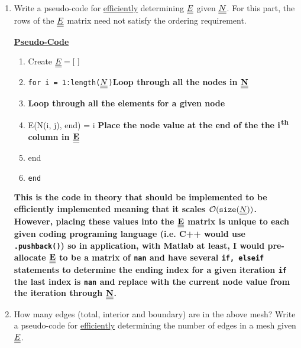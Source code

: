\begin{enumerate}[label=\alph*., start = 1]
    \begin{fminipage}{0.8\linewidth}
        \textbf{Shown above are the matrices for $\bf \doubleunderline{E}$ and $\bf \doubleunderline{N}$ for the irregular mesh as indicated in Section 1.7.5 of the course notes.}
    \end{fminipage}

    \pagebreak
    \item Write a pseudo-code for \underline{efficiently} determining $\underline{\underline{E}}$ given $\underline{\underline{N}}$. For  this  part,  the  rows  of  the $\underline{\underline{E}}$ matrix need not satisfy the ordering requirement.
    
    \textbf{\underline{Pseudo-Code}}
    \begin{enumerate}[label =\arabic*:]
        \item Create $\doubleunderline{E} = [\ ]$
        \item {\tt for i = 1:length($\underline{\underline{N}}$)}\quad \textbf{Loop through all the nodes in $\bf \doubleunderline{N}$}
        \item {}\quad \textbf{Loop through all the elements for a given node}
        \item \quad\quad E(N(i, j), end) = i \quad \textbf{Place the node value at the end of the the $\bf i$\textsuperscript{th} column in $\bf \doubleunderline{E}$}
        \item \quad end
        \item {\tt end}
    \end{enumerate}

    \begin{fminipage}{0.9\linewidth}
        \textbf{This is the code in theory that should be implemented to be efficiently implemented meaning that it scales $\mathcal{O}({\tt{size}}(\underline{\underline{N}}))$. However, placing these values into the $\bf \doubleunderline{E}$ matrix is unique to each given coding programing language (i.e. C++ would use {\tt{.pushback()}}) so in application, with Matlab at least, I would pre-allocate $\bf \doubleunderline{E}$ to be a matrix of {\tt{nan}} and have several {\tt{if, elseif}} statements to determine the ending index for a given iteration {\tt{if}} the last index is {\tt{nan}} and replace with the current node value from the iteration through $\bf \doubleunderline{N}$.}
    \end{fminipage}
    \item How many edges (total, interior and boundary) are in the above mesh?  Write a pseudo-code for \underline{efficiently} determining the number of edges in a mesh given $\underline{\underline{E}}$.
    

\end{enumerate}
